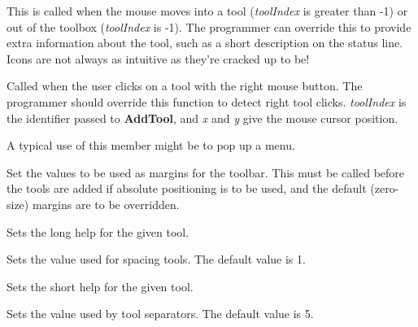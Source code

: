 

This is called when the mouse moves into a tool ({\it toolIndex} is
greater than -1) or out of the toolbox ({\it toolIndex} is -1). The
programmer can override this to provide extra information about the tool,
such as a short description on the status line. Icons are not always as
intuitive as they're cracked up to be!



Called when the user clicks on a tool with the right mouse button. The
programmer should override this function to detect right tool clicks.
{\it toolIndex} is the identifier passed to {\bf AddTool}, and {\it x}
and {\it y} give the mouse cursor position.

A typical use of this member might be to pop up a menu.



Set the values to be used as margins for the toolbar. This must be
called before the tools are added if absolute positioning is to be used, and the
default (zero-size) margins are to be overridden.



Sets the long help for the given tool.



Sets the value used for spacing tools. The default value is 1.



Sets the short help for the given tool.



Sets the value used by tool separators. The default value is 5.

